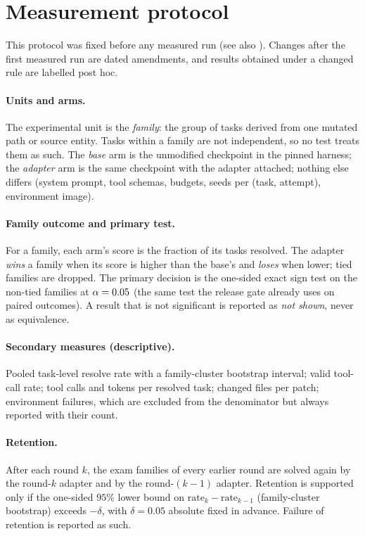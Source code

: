 
\section{Measurement protocol}\label{sec:protocol}

This protocol was fixed before any measured run (see also ).
Changes after the first measured run are dated amendments, and results obtained
under a changed rule are labelled post hoc.

\paragraph{Units and arms.} The experimental unit is the \emph{family}: the group of
tasks derived from one mutated path or source entity. Tasks within a family are not
independent, so no test treats them as such. The \emph{base} arm is the unmodified
checkpoint in the pinned harness; the \emph{adapter} arm is the same checkpoint with the
adapter attached; nothing else differs (system prompt, tool schemas, budgets, seeds per
(task, attempt), environment image).

\paragraph{Family outcome and primary test.} For a family, each arm's score is the fraction
of its tasks resolved. The adapter \emph{wins} a family when its score is higher than the
base's and \emph{loses} when lower; tied families are dropped. The primary decision is the
one-sided exact sign test on the non-tied families at $\alpha=0.05$ (the same
test the release gate already uses on paired outcomes). A result that is not significant
is reported as \emph{not shown}, never as equivalence.

\paragraph{Secondary measures (descriptive).} Pooled task-level resolve rate with a
family-cluster bootstrap interval; valid tool-call rate; tool calls and tokens per
resolved task; changed files per patch; environment failures, which are excluded from the
denominator but always reported with their count.

\paragraph{Retention.} After each round $k$, the exam families of every earlier round are
solved again by the round-$k$ adapter and by the round-$(k{-}1)$ adapter. Retention
is supported only if the one-sided $95\%$ lower bound on
$\text{rate}_k-\text{rate}_{k-1}$ (family-cluster bootstrap) exceeds $-\delta$, with
$\delta=0.05$ absolute fixed in advance. Failure of retention is reported as such.

